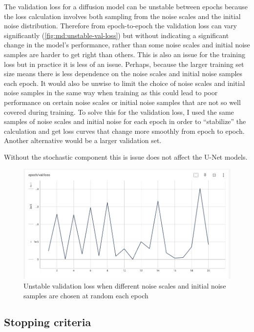 The validation loss for a diffusion model can be unstable between epochs because the loss calculation involves both sampling from the noise scales and the initial noise distribution.
Therefore from epoch-to-epoch the validation loss can vary significantly (\autoref{fig:md:unstable-val-loss}) but without indicating a significant change in the model's performance, rather than some noise scales and initial noise samples are harder to get right than others.
This is also an issue for the training loss but in practice it is less of an issue.
Perhaps, because the larger training set size means there is less dependence on the noise scales and initial noise samples each epoch.
It would also be unwise to limit the choice of noise scales and initial noise samples in the same way when training as this could lead to poor performance on certain noise scales or initial noise samples that are not so well covered during training.
To solve this for the validation loss, I used the same samples of noise scales and initial noise for each epoch in order to ``stabilize'' the calculation and get loss curves that change more smoothly from epoch to epoch.
Another alternative would be a larger validation set.

Without the stochastic component this is issue does not affect the U-Net models.

\begin{figure}
  \centering
  \includegraphics[width=\textwidth]{chapters/figures/3_md/loss/unstable-pr-12em-pslS4T4V4-val-loss.png}
  \caption{Unstable validation loss when different noise scales and initial noise samples are chosen at random each epoch}
  \label{fig:md:unstable-val-loss}
\end{figure}


\subsection{Stopping criteria}

